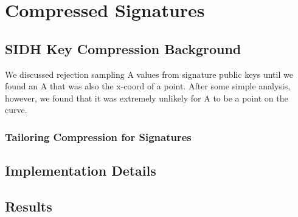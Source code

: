 \chapter{Compressed Signatures}

\section{SIDH Key Compression Background}

We discussed rejection sampling A values from signature public keys until we found an A that was also the x-coord of a point. After some simple analysis, however, we found that it was extremely unlikely for A to be a point on the curve.\\

\subsection{Tailoring Compression for Signatures}

\section{Implementation Details}

\section{Results}

